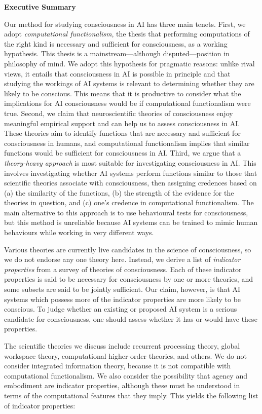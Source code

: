 \documentclass[12pt]{article}
\newenvironment{executivesummarypage}
  {
   \noindent\LARGE \textbf{Executive Summary} \normalsize
   \vspace{1em}
   \par\noindent
  }
  {\newpage}
\begin{document}
\begin{executivesummarypage}
Our method for studying consciousness in AI has three main tenets. First, we adopt \textit{computational functionalism}, the thesis that performing computations of the right kind is necessary and sufficient for consciousness, as a working hypothesis. This thesis is a mainstream—although disputed—position in philosophy of mind. We adopt this hypothesis for pragmatic reasons: unlike rival views, it entails that consciousness in AI is possible in principle and that studying the workings of AI systems is relevant to determining whether they are likely to be conscious. This means that it is productive to consider what the implications for AI consciousness would be if computational functionalism were true. Second, we claim that neuroscientific theories of consciousness enjoy meaningful empirical support and can help us to assess consciousness in AI. These theories aim to identify functions that are necessary and sufficient for consciousness in humans, and computational functionalism implies that similar functions would be sufficient for consciousness in AI. Third, we argue that a \textit{theory-heavy approach} is most suitable for investigating consciousness in AI. This involves investigating whether AI systems perform functions similar to those that scientific theories associate with consciousness, then assigning credences based on (a) the similarity of the functions, (b) the strength of the evidence for the theories in question, and (c) one’s credence in computational functionalism. The main alternative to this approach is to use behavioural tests for consciousness, but this method is unreliable because AI systems can be trained to mimic human behaviours while working in very different ways.

Various theories are currently live candidates in the science of consciousness, so we do not endorse any one theory here. Instead, we derive a list of \textit{indicator properties} from a survey of theories of consciousness. Each of these indicator properties is said to be necessary for consciousness by one or more theories, and some subsets are said to be jointly sufficient. Our claim, however, is that AI systems which possess more of the indicator properties are more likely to be conscious. To judge whether an existing or proposed AI system is a serious candidate for consciousness, one should assess whether it has or would have these properties.

The scientific theories we discuss include recurrent processing theory, global workspace theory, computational higher-order theories, and others. We do not consider integrated information theory, because it is not compatible with computational functionalism. We also consider the possibility that agency and embodiment are indicator properties, although these must be understood in terms of the computational features that they imply. This yields the following list of indicator properties:


\end{executivesummarypage}
\end{document}
